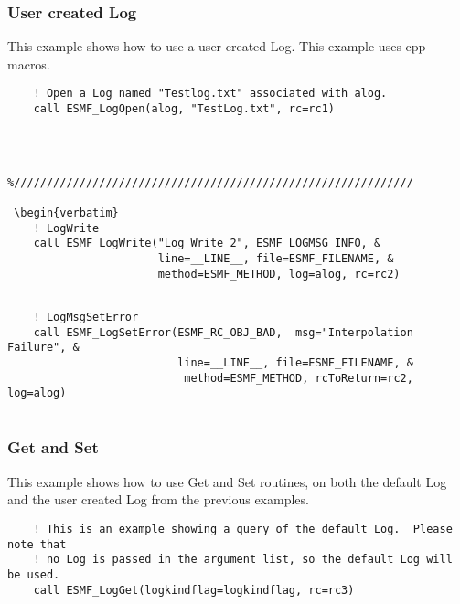 
  \subsubsection{User created Log}
   This example shows how to use a user created Log.  This example uses
   cpp macros. 

 \begin{verbatim}
    ! Open a Log named "Testlog.txt" associated with alog.
    call ESMF_LogOpen(alog, "TestLog.txt", rc=rc1)
 
\end{verbatim}
 
 

 \begin{verbatim}

 
%/////////////////////////////////////////////////////////////

 \begin{verbatim}
    ! LogWrite
    call ESMF_LogWrite("Log Write 2", ESMF_LOGMSG_INFO, &
                       line=__LINE__, file=ESMF_FILENAME, &
                       method=ESMF_METHOD, log=alog, rc=rc2)
 
\end{verbatim}
 

 \begin{verbatim}
    ! LogMsgSetError
    call ESMF_LogSetError(ESMF_RC_OBJ_BAD,  msg="Interpolation Failure", &
                          line=__LINE__, file=ESMF_FILENAME, &
                           method=ESMF_METHOD, rcToReturn=rc2, log=alog)
 
\end{verbatim}
 

  \subsubsection{Get and Set}
   This example shows how to use Get and Set routines, on both the default Log
   and the user created Log from the previous examples. 

 \begin{verbatim}
    ! This is an example showing a query of the default Log.  Please note that
    ! no Log is passed in the argument list, so the default Log will be used.
    call ESMF_LogGet(logkindflag=logkindflag, rc=rc3)
 
\end{verbatim}
 
